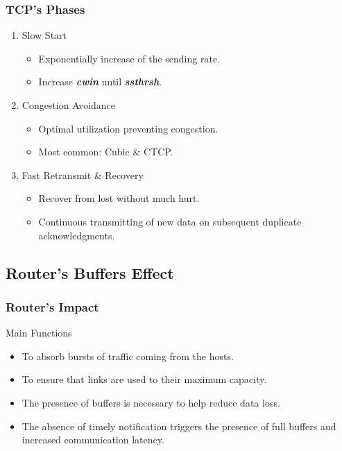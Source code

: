 \begin{frame}
	\frametitle{TCP's Phases}
	\begin{block}{}
		\begin{enumerate}
			\item Slow Start
			\begin{itemize}
				\item Exponentially increase of the sending rate.
				\item Increase \textbf{\textit{cwin}} until \textbf{\textit{ssthrsh}}.
			\end{itemize}
		\end{enumerate}
	\end{block}
	\begin{block}{}
		\begin{enumerate}
				\setcounter{enumi}{1}
			\item Congestion Avoidance 
			\begin{itemize}
				\item Optimal utilization preventing congestion.
				\item Most common: Cubic \& CTCP.
			\end{itemize}
		\end{enumerate}
	\end{block}
	\begin{block}{}
		\begin{enumerate}
			\setcounter{enumi}{2}
			\item Fast Retransmit \& Recovery
			\begin{itemize}
				\item Recover from lost without much hurt.
				\item Continuous transmitting of new data on subsequent duplicate acknowledgments.
			\end{itemize}
		\end{enumerate}
	\end{block}
\end{frame}

\subsection{Router's Buffers Effect}
\begin{frame}
	\frametitle{Router's Impact}
	\begin{block}{Main Functions}
		\begin{itemize}
			\item To absorb bursts of traffic coming from the hosts.
			\item To ensure that links are used to their maximum capacity.
		\end{itemize}
	\end{block}
	\begin{itemize}
		\item The presence of buffers is necessary to help reduce data loss.
		\item The absence of timely notification triggers the presence of full buffers and increased communication latency.
	\end{itemize}
\end{frame}

